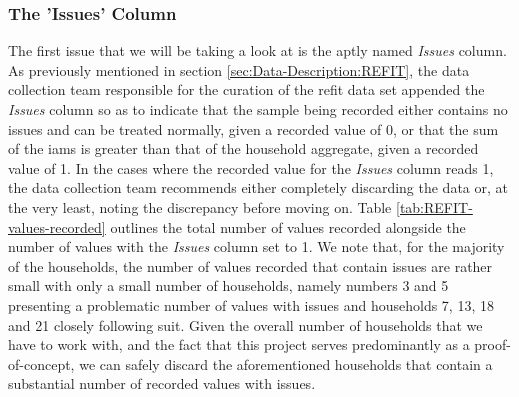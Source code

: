 \subsubsection{The 'Issues' Column}
\label{subsubsec:Exploratory-Data-Analysis:REFIT:Issues:The-Issues-Column}
The first issue that we will be taking a look at is the aptly named \textit{Issues} column. As previously mentioned in section \ref{sec:Data-Description:REFIT}, the data collection team responsible for the curation of the \gls{refit} data set appended the \textit{Issues} column so as to indicate that the sample being recorded either contains no issues and can be treated normally, given a recorded value of 0, or that the sum of the \glspl{iam} is greater than that of the household aggregate, given a recorded value of 1. In the cases where the recorded value for the \textit{Issues} column reads 1, the data collection team recommends either completely discarding the data or, at the very least, noting the discrepancy before moving on. Table \ref{tab:REFIT-values-recorded} outlines the total number of values recorded alongside the number of values with the \textit{Issues} column set to 1. We note that, for the majority of the households, the number of values recorded that contain issues are rather small with only a small number of households, namely numbers 3 and 5 presenting a problematic number of values with issues and households 7, 13, 18 and 21 closely following suit. Given the overall number of households that we have to work with, and the fact that this project serves predominantly as a proof-of-concept, we can safely discard the aforementioned households that contain a substantial number of recorded values with issues.


